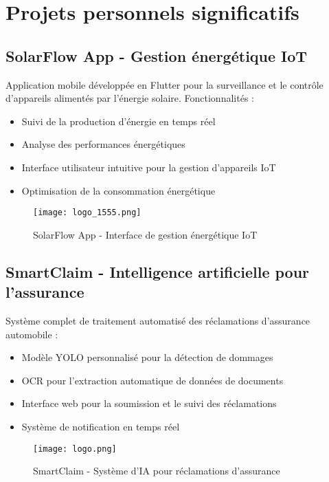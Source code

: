 \documentclass[12pt,a4paper]{report}
\begin{document}
\section{Projets personnels significatifs}

\subsection{SolarFlow App - Gestion énergétique IoT}
Application mobile développée en Flutter pour la surveillance et le contrôle d'appareils alimentés par l'énergie solaire. Fonctionnalités :
\begin{itemize}
    \item Suivi de la production d'énergie en temps réel
    \item Analyse des performances énergétiques
    \item Interface utilisateur intuitive pour la gestion d'appareils IoT
    \item Optimisation de la consommation énergétique
\end{itemize}

\begin{figure}[H]
    \centering
    \texttt{[image: logo\_1555.png]}
    \caption{SolarFlow App - Interface de gestion énergétique IoT}
    \label{fig:solarflow_app}
\end{figure}

\subsection{SmartClaim - Intelligence artificielle pour l'assurance}
Système complet de traitement automatisé des réclamations d'assurance automobile :
\begin{itemize}
    \item Modèle YOLO personnalisé pour la détection de dommages
    \item OCR pour l'extraction automatique de données de documents
    \item Interface web pour la soumission et le suivi des réclamations
    \item Système de notification en temps réel
\end{itemize}

\begin{figure}[H]
    \centering
    \texttt{[image: logo.png]}
    \caption{SmartClaim - Système d'IA pour réclamations d'assurance}
    \label{fig:smartclaim_app}
\end{figure}
\end{document}

